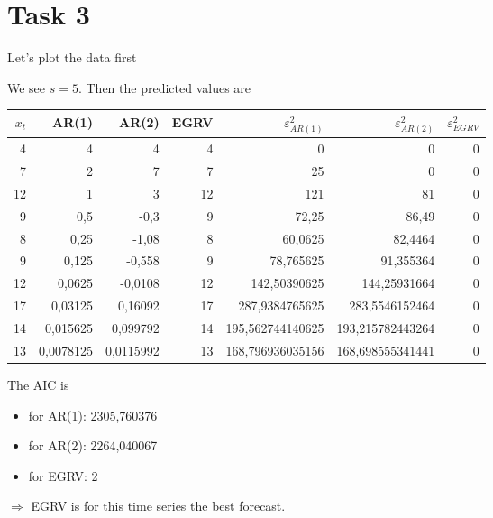 \documentclass{article}
\begin{document}
	\section*{Task 3}
	Let's plot the data first
	\begin{center}
	\end{center}
	We see $s=5$. Then the predicted values are
	\begin{center}
		\begin{tabular}{r|rrr|rrr}
			\textbf{$x_t$} & \textbf{AR(1)} & \textbf{AR(2)} & \textbf{EGRV} & \textbf{$\varepsilon_{AR(1)}^2$} & \textbf{$\varepsilon_{AR(2)}^2$} & \textbf{$\varepsilon_{EGRV}^2$} \\
			\hline
			4 & 4 & 4 & 4 & 0 & 0 & 0 \\
			\hline
			7 & 2 & 7 & 7 & 25 & 0 & 0 \\
			\hline
			12 & 1 & 3 & 12 & 121 & 81 & 0 \\
			\hline
			9 & 0,5 & -0,3 & 9 & 72,25 & 86,49 & 0 \\
			\hline
			8 & 0,25 & -1,08 & 8 & 60,0625 & 82,4464 & 0 \\
			\hline
			9 & 0,125 & -0,558 & 9 & 78,765625 & 91,355364 & 0 \\
			\hline
			12 & 0,0625 & -0,0108 & 12 & 142,50390625 & 144,25931664 & 0 \\
			\hline
			17 & 0,03125 & 0,16092 & 17 & 287,9384765625 & 283,5546152464 & 0 \\
			\hline
			14 & 0,015625 & 0,099792 & 14 & 195,562744140625 & 193,215782443264 & 0 \\
			\hline
			13 & 0,0078125 & 0,0115992 & 13 & 168,796936035156 & 168,698555341441 & 0 
		\end{tabular}
	\end{center}
	The AIC is
	\begin{itemize}
		\item for AR(1): 2305,760376
		\item for AR(2): 2264,040067
		\item for EGRV: 2
	\end{itemize}
	$\Rightarrow$ EGRV is for this time series the best forecast.
\end{document}
